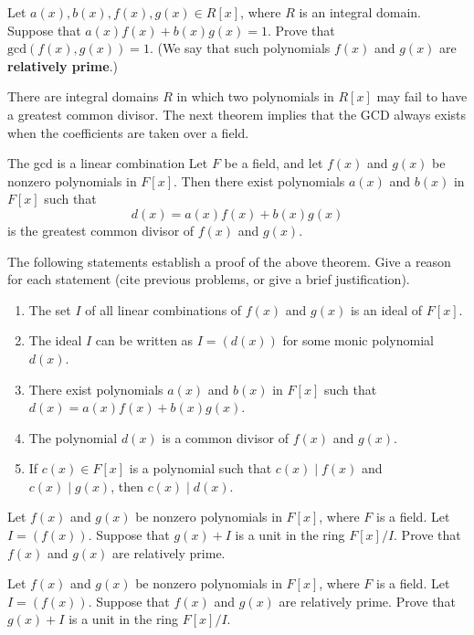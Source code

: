 \begin{problem}
Let \(a(x), b(x), f(x), g(x) \in R[x]\), where \(R\) is an integral domain. Suppose that \(a(x)f(x)+b(x)g(x) = 1\). Prove that \(\mbox{gcd}(f(x),g(x))=1\). (We say that such polynomials \(f(x)\) and \(g(x)\) are \textbf{relatively prime}.)
\end{problem}

There are integral domains \(R\) in which two polynomials in \(R[x]\) may fail to have a greatest common divisor. The next theorem implies that the GCD always exists when the coefficients are taken over a field.

\begin{theorem}{The gcd is a linear combination}
Let \(F\) be a field, and let \(f(x)\) and \(g(x)\) be nonzero polynomials in \(F[x]\). Then there exist polynomials \(a(x)\) and \(b(x)\) in \(F[x]\) such that \[d(x) = a(x)f(x) + b(x)g(x)\]
is the greatest common divisor of \(f(x)\) and \(g(x)\).
\end{theorem}

\begin{problem}
The following statements establish a proof of the above theorem. Give a reason for each statement (cite previous problems, or give a brief justification).
\begin{enumerate}
  \item The set \(I\) of all linear combinations of \(f(x)\) and \(g(x)\) is an ideal of \(F[x]\).
  \item The ideal \(I\) can be written as \(I = (d(x))\) for some monic polynomial \(d(x)\).
  \item There exist polynomials \(a(x)\) and \(b(x)\) in \(F[x]\) such that \(d(x) = a(x)f(x) + b(x)g(x)\).
  \item The polynomial \(d(x)\) is a common divisor of \(f(x)\) and \(g(x)\).
  \item If \(c(x)\in F[x]\) is a polynomial such that \(c(x) \mid f(x)\) and \(c(x) \mid g(x)\), then \(c(x) \mid d(x)\).
\end{enumerate}
\end{problem}

\begin{problem}
Let \(f(x)\) and \(g(x)\) be nonzero polynomials in \(F[x]\), where \(F\) is a field. Let \(I = (f(x))\). Suppose that \(g(x) + I\) is a unit in the ring \(F[x]/I\). Prove that \(f(x)\) and \(g(x)\) are relatively prime.
\end{problem}

\begin{problem}
Let \(f(x)\) and \(g(x)\) be nonzero polynomials in \(F[x]\), where \(F\) is a field. Let \(I = (f(x))\). Suppose that \(f(x)\) and \(g(x)\) are relatively prime. Prove that \(g(x) + I\) is a unit in the ring \(F[x]/I\).
\end{problem}

